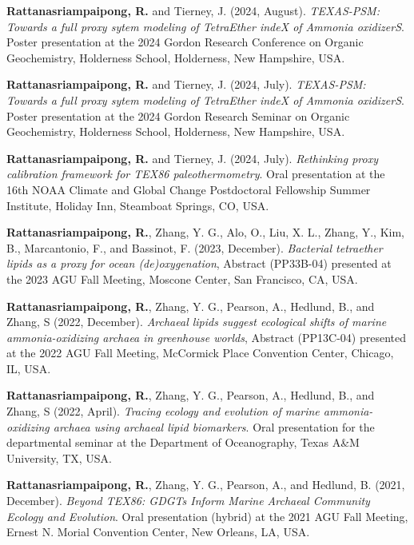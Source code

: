 \documentclass[10pt, letter]{article}
\newcommand{\myname}[1]{\textbf{Rattanasriampaipong, R.}}
\begin{document}
\begin{etaremune}
\item {\myname{rattanasriampaipong}} and Tierney, J. (2024, August). \textit{TEXAS-PSM: Towards a full proxy sytem modeling of TetraEther indeX of Ammonia oxidizerS}. Poster presentation at the 2024 Gordon Research Conference on Organic Geochemistry, Holderness School, Holderness, New Hampshire, USA.

\item {\myname{rattanasriampaipong}} and Tierney, J. (2024, July). \textit{TEXAS-PSM: Towards a full proxy sytem modeling of TetraEther indeX of Ammonia oxidizerS}. Poster presentation at the 2024 Gordon Research Seminar on Organic Geochemistry, Holderness School, Holderness, New Hampshire, USA.

\item {\myname{rattanasriampaipong}} and Tierney, J. (2024, July). \textit{Rethinking proxy calibration framework for TEX86 paleothermometry}. Oral presentation at the 16th NOAA Climate and Global Change Postdoctoral Fellowship Summer Institute, Holiday Inn, Steamboat Springs, CO, USA.

\item {\myname{rattanasriampaipong}}, Zhang, Y. G., Alo, O., Liu, X. L., Zhang, Y., Kim, B., Marcantonio, F., and Bassinot, F. (2023, December). \textit{Bacterial tetraether lipids as a proxy for ocean (de)oxygenation}, Abstract (PP33B-04) presented at the 2023 AGU Fall Meeting, Moscone Center, San Francisco, CA, USA.

\item {\myname{rattanasriampaipong}}, Zhang, Y. G., Pearson, A., Hedlund, B., and Zhang, S (2022, December). \textit{Archaeal lipids suggest ecological shifts of marine ammonia-oxidizing archaea in greenhouse worlds}, Abstract (PP13C-04) presented at the 2022 AGU Fall Meeting, McCormick Place Convention Center, Chicago, IL, USA.

\item {\myname{rattanasriampaipong}}, Zhang, Y. G., Pearson, A., Hedlund, B., and Zhang, S (2022, April). \textit{Tracing ecology and evolution of marine ammonia-oxidizing archaea using archaeal lipid biomarkers}. Oral presentation for the departmental seminar at the Department of Oceanography, Texas A\&M University, TX, USA.

\item {\myname{rattanasriampaipong}}, Zhang, Y. G., Pearson, A., and Hedlund, B. (2021, December). \textit{Beyond TEX86: GDGTs Inform Marine Archaeal Community Ecology and Evolution}. Oral presentation (hybrid) at the 2021 AGU Fall Meeting, Ernest N. Morial Convention Center, New Orleans, LA, USA.


\end{etaremune}
\end{document}
